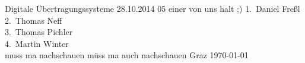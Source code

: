 \TUHeader                          %
{Digitale Übertragungssysteme}                       %
{28.10.2014}                        %
{05}                            %
{einer von uns halt ;)}                   %
{
1.~Daniel Freßl\\
2.~Thomas Neff\\                    %
3.~Thomas Pichler \\                   %
4.~Martin Winter\\
}
{muss ma nachschauen}
{müss ma auch nachschauen}                          %
{Graz}                              %
{\today}                            %




\pagebreak
  
\tableofcontents
  
\pagebreak
